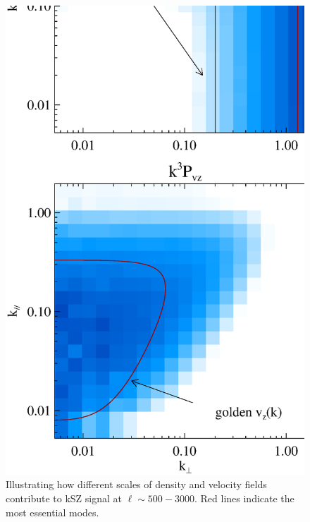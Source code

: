 \begin{figure}[btp]
\captionsetup{width=0.28\linewidth,justification=raggedright}
\begin{minipage}[t]{0.33\linewidth}
\begin{center}
\includegraphics[width=\textwidth,height=1.7\textwidth]{figure/k3pd_k3pv_z1_note.eps}
\end{center}
\vspace{-0.7cm}
\caption{
    Illustrating how different scales of density and velocity 
    fields contribute to kSZ signal at $\ell\sim 500-3000$. 
    Red lines indicate the most essential modes. 
}
\end{minipage}
\end{figure}
